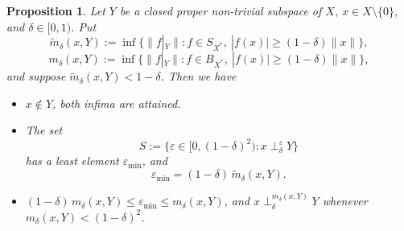 \documentclass[11pt, reqno]{amsart}
\newtheorem{proposition}[theorem]{Proposition}
\theoremstyle{definition}
\begin{document}
\begin{proposition}\label{thm:bound}
Let $Y$ be a closed proper non-trivial subspace of $X$, $x \in X \setminus \{0\}$,
and $\delta \in [0,1)$. Put
\[
\widetilde m_\delta(x,Y) := \inf\bigl\{\|f|_Y\| : f \in S_{X^*},\
|f(x)| \geq (1-\delta)\|x\|\bigr\},
\]
\[
m_\delta(x,Y) := \inf\bigl\{\|f|_Y\| : f \in B_{X^*},\
|f(x)| \geq (1-\delta)\|x\|\bigr\},
\]
and suppose $\widetilde m_\delta(x,Y) < 1-\delta$. Then we have
\begin{itemize}
    \item[(a)] $x\notin Y$, both infima are attained.
    \item[(b)] The set
\[
S := \bigl\{\varepsilon \in [0,(1-\delta)^2) : x \perp_\delta^{\varepsilon} Y\bigr\}
\]
has a least element $\varepsilon_{\min}$, and
\[
\varepsilon_{\min} = (1-\delta)\,\widetilde m_\delta(x,Y).
\]
    \item[(c)] $(1-\delta)\,m_\delta(x,Y) \leq \varepsilon_{\min} \leq m_\delta(x,Y)$, and
$x \perp_\delta^{m_\delta(x,Y)} Y$ whenever $m_\delta(x,Y)<(1-\delta)^2$.
\end{itemize}
\end{proposition}
\end{document}
